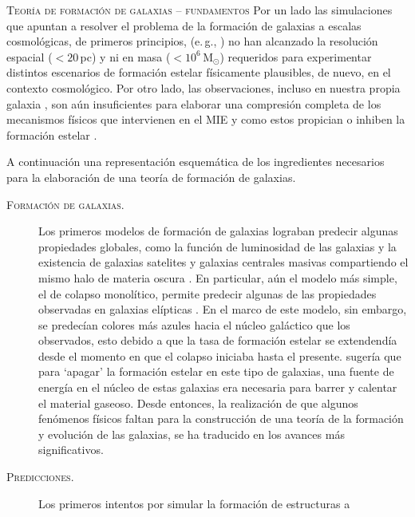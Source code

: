\documentclass[xcolor=dvipsnames,4pt,hyperref={colorlinks,citecolor=black,linkcolor=black,urlcolor=black}]{beamer}
\begin{document}
\begin{frame}[allowframebreaks]{\textsc{Teoría de formación de galaxias -- fundamentos}}
Por un lado las simulaciones que apuntan a resolver el problema de la formación de galaxias a
escalas cosmológicas, de primeros principios, (e.\,g.,
\cites[\textsc{millenium}][]{Springel2005c}[\textsc{illustris}][]{Vogelsberger2014}) no han
alcanzado la resolución espacial ($<20\,$pc) y ni en masa ($<10^6\,$M$_\odot$) requeridos para
experimentar distintos escenarios de formación estelar físicamente plausibles, de nuevo, en el
contexto cosmológico. Por otro lado, las observaciones, incluso en nuestra propia galaxia
\citep[e.\,g.][]{Lada2010}, son aún insuficientes para elaborar una compresión completa de los
mecanismos físicos que intervienen en el MIE y como estos propician o inhiben la formación estelar
\citep[véase][para revisiones recientes]{McKee2007, Krumholz2014, Naab2016}.

A continuación una representación esquemática de los ingredientes necesarios para la elaboración de
una teoría de formación de galaxias.
%
%
\begin{description}
%
\item[\textsc{Formación de galaxias.}] Los primeros modelos de formación de galaxias lograban
predecir algunas propiedades globales, como la función de luminosidad de las galaxias y la
existencia de galaxias satelites y galaxias centrales masivas compartiendo el mismo halo de materia
oscura \citep{White1978}.
En particular, aún el modelo más simple, el de colapso monolítico, permite predecir algunas de las
propiedades observadas en galaxias elípticas \citep{Larson1974b, Larson1974c}.
En el marco de este modelo, sin embargo, se predecían colores más azules hacia el núcleo galáctico
que los observados, esto debido a que la tasa de formación estelar se extendendía desde el momento
en que el colapso iniciaba hasta el presente. \citet{Larson1974c} sugería que para `apagar' la
formación estelar en este tipo de galaxias, una fuente de energía en el núcleo de estas galaxias era
necesaria para barrer y calentar el material gaseoso. Desde entonces, la realización de que algunos
fenómenos físicos faltan para la construcción de una teoría de la formación y evolución de las
galaxias, se ha traducido en los avances más significativos.
%
\item[\textsc{Predicciones.}] Los primeros intentos por simular la formación de estructuras a

\end{description}
\end{frame}
\end{document}
